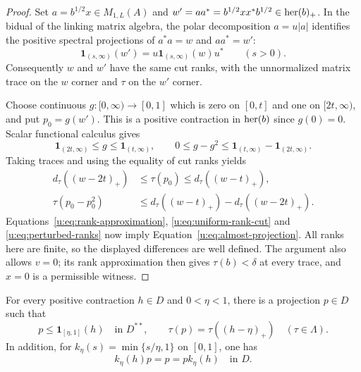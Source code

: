 \begin{proof}
Set $a=b^{1/2}x\in M_{1,L}(A)$ and
$w'=aa^*=b^{1/2}xx^*b^{1/2}\in\operatorname{her}(b)_+$.  In the bidual of the
linking matrix algebra, the polar decomposition $a=u|a|$ identifies
the positive spectral projections of $a^*a=w$ and $aa^*=w'$:
\[
 \mathbf 1_{(s,\infty)}(w')
    =u\mathbf 1_{(s,\infty)}(w)u^*
 \qquad(s>0).
\]
Consequently $w$ and $w'$ have the same cut ranks, with the
unnormalized matrix trace on the $w$ corner and $\tau$ on the $w'$
corner.

Choose continuous $g:[0,\infty)\to[0,1]$ which is zero on $[0,t]$
and one on $[2t,\infty)$, and put $p_0=g(w')$.  This is a positive
contraction in $\operatorname{her}(b)$ since $g(0)=0$.  Scalar functional calculus
gives
\[
 \mathbf 1_{(2t,\infty)}\le g\le\mathbf 1_{(t,\infty)},
 \qquad
 0\le g-g^2\le
       \mathbf 1_{(t,\infty)}-\mathbf 1_{(2t,\infty)}.
\]
Taking traces and using the equality of cut ranks yields
\[
 \begin{split}
 d_\tau((w-2t)_+)&\le\tau(p_0)\le d_\tau((w-t)_+),\\
 \tau(p_0-p_0^2)&\le
       d_\tau((w-t)_+)-d_\tau((w-2t)_+).
 \end{split}
\]
Equations~\eqref{u:eq:rank-approximation},
\eqref{u:eq:uniform-rank-cut} and \eqref{u:eq:perturbed-ranks} now imply
Equation~\eqref{u:eq:almost-projection}.  All ranks here are finite,
so the displayed differences are well defined.  The argument also
allows $v=0$; its rank approximation then gives $\tau(b)<\delta$
at every trace, and $x=0$ is a permissible witness.
\end{proof}

\begin{proposition}
\label{u:prop:projection-supply}
For every positive contraction $h\in D$ and $0<\eta<1$, there is a
projection $p\in D$ such that
\begin{equation}
 p\le\mathbf 1_{[\eta,1]}(h)\quad\text{in }D^{**},
 \qquad
 \tau(p)=\tau((h-\eta)_+)
       \quad(\tau\in\Lambda).
 \label{u:eq:projection-supply}
\end{equation}
In addition, for $k_\eta(s)=\min\{s/\eta,1\}$ on $[0,1]$, one has
\begin{equation}
 k_\eta(h)p=p=pk_\eta(h)\quad\text{in }D.
 \label{u:eq:projection-cutoff}
\end{equation}
\end{proposition}

